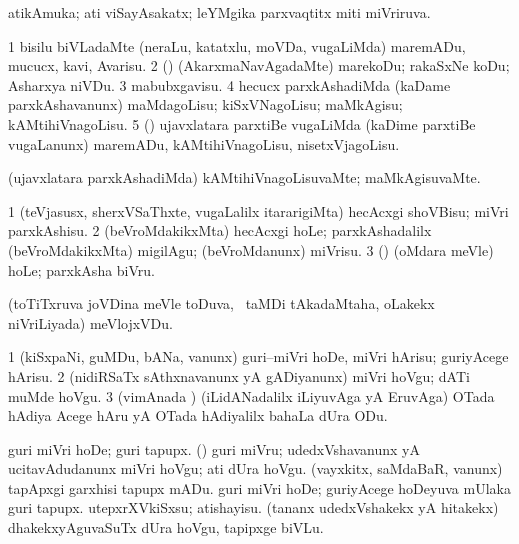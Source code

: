 \bentry
{}
\gl{\gu}
\bmng
atikAmuka; ati viSayAsakatx; leYMgika parxvaqtitx miti miVriruva. 
\emng
\eentry

\bentry
{}
\gl{\sakirx}
\bmng
\bnum
\num{1} bisilu biVLadaMte (neraLu, katatxlu, moVDa, \mo vugaLiMda) maremADu, mucucx, kavi, Avarisu. 
\num{2} (\viparx) (AkarxmaNavAgadaMte) marekoDu; rakaSxNe koDu; Asharxya niVDu. 
\num{3} mabubxgavisu. 
\num{4} hecucx parxkAshadiMda (kaDame parxkAshavanunx) maMdagoLisu; kiSxVNagoLisu; maMkAgisu; kAMtihiVnagoLisu. 
\num{5} (\rUpa) ujavxlatara parxtiBe \mo vugaLiMda (kaDime parxtiBe \mo vugaLanunx) maremADu, kAMtihiVnagoLisu, nisetxVjagoLisu. 
\enum
\emng
\eentry


\bentry
{}
\gl{\kirxvi}
\bmng
(ujavxlatara parxkAshadiMda) kAMtihiVnagoLisuvaMte; maMkAgisuvaMte. 
\emng
\eentry


\bentry
{}
\gl{\sakirx}
\bmng
\bnum
\num{1} (teVjasusx, sherxVSaThxte, \mo vugaLalilx itararigiMta) hecAcxgi shoVBisu; miVri parxkAshisu. 
\num{2} (beVroMdakikxMta) hecAcxgi hoLe; parxkAshadalilx (beVroMdakikxMta) migilAgu; (beVroMdanunx) miVrisu. 
\num{3} (\pArxparx) (oMdara meVle) hoLe; parxkAsha biVru. 
\enum
\emng
\eentry


\bentry
{}
\gl{\nA}
\bmng
(toTiTxruva joVDina meVle toDuva, \kanmu\ taMDi tAkadaMtaha, oLakekx niVriLiyada) meVlojxVDu. 
\emng
\eentry


\bentry
{}
\gl{\sakirx}
\bmng
\bnum
\num{1} (kiSxpaNi, guMDu, bANa, \mo vanunx) guri--miVri hoDe, miVri hArisu; guriyAcege hArisu. 
\num{2} (nidiRSaTx sAthxnavanunx yA gADiyanunx) miVri hoVgu; dATi muMde hoVgu. 
\num{3} (vimAnada \vi) (iLidANadalilx iLiyuvAga yA EruvAga) OTada hAdiya Acege hAru yA OTada hAdiyalilx bahaLa dUra ODu. 
\enum
\emng

\noindent
\gl{\pagu}
\bmng
\bnum
{}  
\banum
{} guri miVri hoDe; guri tapupx. 
 (\rUpa) guri miVru; udedxVshavanunx yA ucitavAdudanunx miVri hoVgu; ati dUra hoVgu. 
 (vayxkitx, saMdaBaR, \mo vanunx) tapApxgi garxhisi tapupx mADu. 
\eanum
\numie
{}  
\banum
{} guri miVri hoDe; guriyAcege hoDeyuva mUlaka guri tapupx. 
 utepxrXVkiSxsu; atishayisu. 
 (tananx udedxVshakekx yA hitakekx) dhakekxyAguvaSuTx dUra hoVgu, tapipxge biVLu. 
\eanum
\numie
\enum
\emng
\eentry


